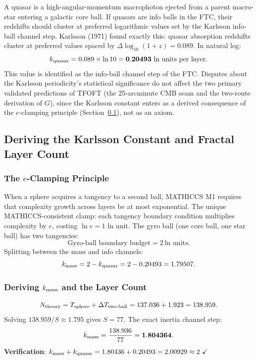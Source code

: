 \documentclass[11pt,a4paper]{article}
\begin{document}
A quasar is a high-angular-momentum macrophoton ejected from a parent macro-star entering a galactic core ball. If quasars are info balls in the FTC, their redshifts should cluster at preferred logarithmic values set by the Karlsson info-ball channel step. Karlsson (1971) found exactly this: quasar absorption redshifts cluster at preferred values spaced by $\Delta\log_{10}(1+z) = 0.089$. In natural log:
\[
k_{\rm quasar} = 0.089 \times \ln 10 = \mathbf{0.20493}
\ \text{ln units per layer.}
\]
This value is identified as the info-ball channel step of the FTC. Disputes about the Karlsson periodicity's statistical significance do not affect the two primary validated predictions of TFOFT (the 25-arcminute CMB seam and the two-route derivation of $G$), since the Karlsson constant enters as a derived consequence of the $e$-clamping principle (Section~\ref{sec:ecamp}), not as an axiom.

\subsection{Deriving the Karlsson Constant and Fractal Layer Count}
\label{sec:ecamp}

\subsubsection{The $e$-Clamping Principle}

When a sphere acquires a tangency to a second ball, MATHICCS M1 requires that complexity growth across layers be at most exponential. The unique MATHICCS-consistent clamp: each tangency boundary condition multiplies complexity by $e$, costing $\ln e = 1$ ln unit. The gyro ball (one core ball, one star ball) has two tangencies:
\[
\text{Gyro-ball boundary budget} = 2\ \text{ln units}.
\]
Splitting between the mass and info channels:
\[
k_{\rm mass} = 2 - k_{\rm quasar} = 2 - 0.20493 = 1.79507.
\]

\subsubsection{Deriving $k_{\rm mass}$ and the Layer Count}

\[
N_{\rm theory} = T_{\rm sphere} + \Delta T_{\rm two\text{-}ball}
  = 137.036 + 1.923 = 138.959.
\]
Solving $138.959/S \approx 1.795$ gives $S = 77$. The exact inertia channel step:
\[
k_{\rm mass} = \frac{138.936}{77} = \mathbf{1.804364}.
\]
\textbf{Verification}: $k_{\rm mass} + k_{\rm quasar} = 1.80436 + 0.20493 = 2.00929 \approx 2\ \checkmark$
\end{document}
